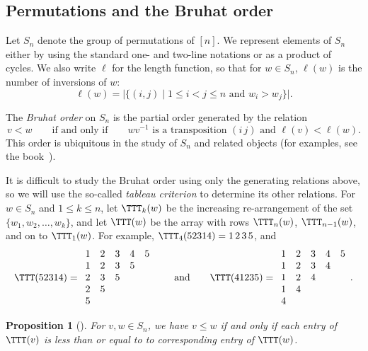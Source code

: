 \documentclass[12pt]{amsart}
\newtheorem{prop}[equation]{Proposition}
\theoremstyle{definition}
\theoremstyle{remark}
\numberwithin{equation}{section}
\begin{document}
\subsection{Permutations and the Bruhat order}
\label{sec:bruhat}

Let $S_n$ denote the group of permutations of $[n]$.  We represent elements of $S_{n}$ either by using the standard one- and two-line notations or as a product of cycles.  We also write $\ell$ for the length function, so that for $w \in S_{n}$, $\ell(w)$ is the number of inversions of $w$:
\[
\ell(w) = |\{(i, j) \;|\; \text{$1 \le i < j \le n$ and $w_{i} > w_{j}$}\}|.
\]

The \emph{Bruhat order} on $S_{n}$ is the partial order generated by the relation
\[
v < w \qquad\text{if and only if} \qquad \text{$wv^{-1}$ is a transposition $(i\,j)$ and $\ell(v) < \ell(w)$}.
\]
This order is ubiquitous in the study of $S_{n}$ and related objects (for examples, see the book~\cite{BjornerBrenti}).

It is difficult to study the Bruhat order using only the generating relations above, so we will use the so-called \emph{tableau criterion} to determine its other relations.  For $w \in S_{n}$ and $1 \le k \le n$, let $\TTT_{k}(w)$ be the increasing re-arrangement of the set $\{w_{1}, w_{2}, \ldots, w_{k}\}$, and let $\TTT(w)$ be the array with rows $\TTT_{n}(w)$, $\TTT_{n-1}(w)$, and on to $\TTT_{1}(w)$.  For example, $\TTT_{4}(52314) = 1\,2\,3\,5$, and
\[
\TTT(52314) = 
\begin{array}{ccccc} 
1 & 2 & 3 & 4 & 5 \\ 
1 & 2 & 3 & 5 \\ 
2 & 3 & 5 \\ 
2 & 5 \\ 
5
\end{array}
\qquad\text{and}\qquad
\TTT(41235) = \begin{array}{ccccc} 
1 & 2 & 3 & 4 & 5 \\ 
1 & 2 & 3 & 4 \\ 
1 & 2 & 4 \\ 
1 & 4 \\ 
4
\end{array}.
\]

\begin{prop}[{\cite[Theorem 2.6.3]{BjornerBrenti}}]
\label{TableauCriterion}
For $v, w \in S_{n}$, we have $v \le w$  if and only if each entry of $\TTT(v)$ is less than or equal to to corresponding entry of $\TTT(w)$.
\end{prop}
\end{document}
